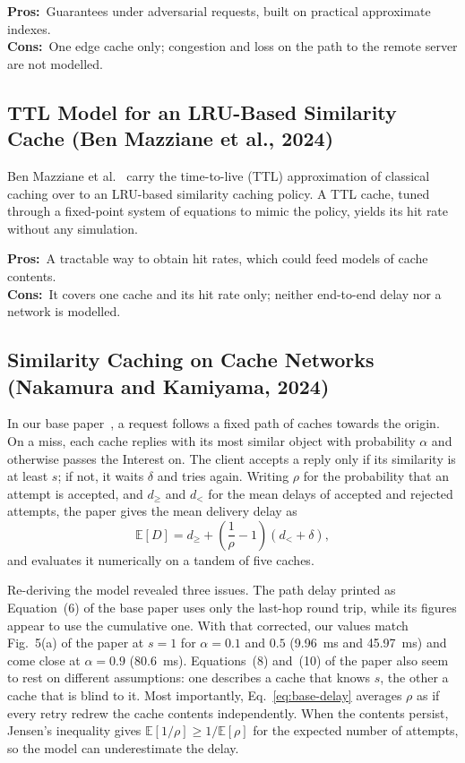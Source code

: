 \documentclass[11pt,a4paper]{article}
\newcommand{\pros}{\textcolor{green!50!black}{\textbf{Pros:}}~}
\newcommand{\cons}{\textcolor{red!70!black}{\textbf{Cons:}}~}
\begin{document}
\pros Guarantees under adversarial requests, built on practical approximate indexes.\\
\cons One edge cache only; congestion and loss on the path to the remote server are not modelled.

\subsection{TTL Model for an LRU-Based Similarity Cache (Ben Mazziane et al., 2024)}
Ben Mazziane et al.~\cite{benmazziane2024ttl} carry the time-to-live (TTL) approximation of classical
caching over to an LRU-based similarity caching policy. A TTL cache, tuned through a fixed-point
system of equations to mimic the policy, yields its hit rate without any simulation.

\pros A tractable way to obtain hit rates, which could feed models of cache contents.\\
\cons It covers one cache and its hit rate only; neither end-to-end delay nor a network is modelled.

\subsection{Similarity Caching on Cache Networks (Nakamura and Kamiyama, 2024)}
In our base paper~\cite{nakamura2024analysis}, a request follows a fixed path of caches towards the
origin. On a miss, each cache replies with its most similar object with probability $\alpha$ and
otherwise passes the Interest on. The client accepts a reply only if its similarity is at least $s$;
if not, it waits $\delta$ and tries again. Writing $\rho$ for the probability that an attempt is
accepted, and $d_{\geq}$ and $d_{<}$ for the mean delays of accepted and rejected attempts, the paper
gives the mean delivery delay as
\begin{equation}
  \mathbb{E}[D] = d_{\geq} + \left(\frac{1}{\rho}-1\right)(d_{<}+\delta),
  \label{eq:base-delay}
\end{equation}
and evaluates it numerically on a tandem of five caches.

Re-deriving the model revealed three issues. The path delay printed as Equation~(6) of the base paper uses only the last-hop round trip, while its figures
appear to use the cumulative one. With that corrected, our values match Fig.~5(a) of the paper at
$s=1$ for $\alpha=0.1$ and $0.5$ (9.96~ms and 45.97~ms) and come close at $\alpha=0.9$ (80.6~ms).
Equations~(8) and~(10) of the paper also seem to rest on different assumptions: one describes a
cache that knows $s$, the other a cache that is blind to it. Most importantly,
Eq.~\eqref{eq:base-delay} averages $\rho$ as if every retry redrew the cache contents independently.
When the contents persist, Jensen's inequality gives $\mathbb{E}[1/\rho] \geq 1/\mathbb{E}[\rho]$ for
the expected number of attempts, so the model can underestimate the delay.
\end{document}
